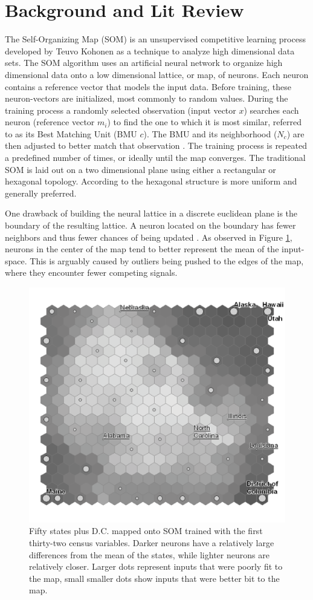 \documentclass[10pt,titlepage]{article}
\begin{document}
\section{Background and Lit Review}
The Self-Organizing Map (SOM) is an unsupervised competitive learning process
developed by Teuvo Kohonen as a technique to analyze high dimensional data sets.
The SOM algorithm uses an artificial neural network to organize high dimensional
data onto a low dimensional lattice, or map, of neurons.  Each neuron contains a
reference vector that models the input data.  Before training, these
neuron-vectors are initialized, most commonly to random values.  During the
training process a randomly selected observation (input vector $x$) searches
each neuron (reference vector $m_i$) to find the one to which it is most
similar, referred to as its Best Matching Unit (BMU $c$).  The BMU and its
neighborhood ($N_c$) are then adjusted to better match that observation
\citep{Kohonen2000}.  The training process is repeated a predefined number of
times, or ideally until the map converges.  The traditional SOM is laid out on a
two dimensional plane using either a rectangular or hexagonal topology.
According to \cite{wu2006} the hexagonal structure is more uniform and generally
preferred.

One drawback of building the neural lattice in a discrete euclidean plane is the
boundary of the resulting lattice.  A neuron located on the boundary has fewer
neighbors and thus fewer chances of being updated \citep{wu2006}.  As observed
in Figure \ref{figure1}, neurons in the center of the map tend to better
represent the mean of the input-space.  This is arguably caused by outliers
being pushed to the edges of the map, where they encounter fewer competing
signals.

\begin{figure}
\centering
\includegraphics[width=.6\linewidth]{gridedge_grey.pdf}
\caption{Fifty states plus D.C. mapped onto SOM trained with the first
thirty-two census variables.  Darker neurons have a relatively large differences
from the mean of the states, while lighter neurons are relatively closer.
Larger dots represent inputs that were poorly fit to the map, small smaller dots
show inputs that were better bit to the map.}
\label{figure1}
\end{figure}
\end{document}
